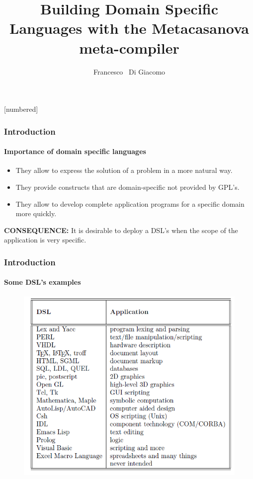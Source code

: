 \documentclass[mathserif,serif]{beamer}
\begin{document}
\newtheorem{proposition}{Proposition}
[numbered]

\author[Di Giacomo]
{Francesco ~Di Giacomo}
\date{}
\title{Building Domain Specific Languages with the Metacasanova meta-compiler}

\frame{\titlepage}

\begin{frame}
	\frametitle{Introduction}
	\framesubtitle{Importance of domain specific languages}
	\begin{itemize}
		\item They allow to express the solution of a problem in a more natural way.
		\item They provide constructs that are domain-specific not provided by GPL's.
		\item They allow to develop complete application programs for a specific domain more quickly.
	\end{itemize}
	
	\pause
	\textbf{CONSEQUENCE:} It is desirable to deploy a DSL's when the scope of the application is very specific.
	
\end{frame}

\begin{frame}
	\frametitle{Introduction}
	\framesubtitle{Some DSL's examples}
	
	\begin{figure}
		\centering
		\includegraphics[scale=0.5]{Figures/dsl_table}
	\end{figure}	
\end{frame}
\end{document}
